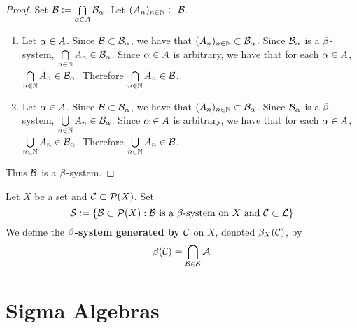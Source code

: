 \documentclass{book}
\begin{document}
	\begin{proof}Set $\mathcal{B} \vcentcolon= \bigcap\limits_{\alpha \in A} \mathcal{B}_{\alpha}$. Let $(A_n)_{n \in \mathbb{N}} \subset \mathcal{B}$.
		\begin{enumerate}
			\item Let $\alpha \in A$. Since $\mathcal{B} \subset \mathcal{B}_{\alpha}$, we have that $(A_n)_{n \in \mathbb{N}} \subset \mathcal{B}_{\alpha}$. Since $\mathcal{B}_{\alpha}$ is a $\beta$-system, $\bigcap\limits_{n \in \mathbb{N}} A_n \in \mathcal{B}_{\alpha}$. Since $\alpha \in A$ is arbitrary, we have that for each $\alpha \in A$, $\bigcap\limits_{n \in \mathbb{N}} A_n \in \mathcal{B}_{\alpha}$. Therefore $\bigcap\limits_{n \in \mathbb{N}} A_n \in \mathcal{B}$.   
			\item Let $\alpha \in A$. Since $\mathcal{B} \subset \mathcal{B}_{\alpha}$, we have that $(A_n)_{n \in \mathbb{N}} \subset \mathcal{B}_{\alpha}$. Since $\mathcal{B}_{\alpha}$ is a $\beta$-system, $\bigcup\limits_{n \in \mathbb{N}} A_n \in \mathcal{B}_{\alpha}$. Since $\alpha \in A$ is arbitrary, we have that for each $\alpha \in A$, $\bigcup\limits_{n \in \mathbb{N}} A_n \in \mathcal{B}_{\alpha}$. Therefore $\bigcup\limits_{n \in \mathbb{N}} A_n \in \mathcal{B}$.   
		\end{enumerate}
		Thus $\mathcal{B}$ is a $\beta$-system.
	\end{proof}
	
	\begin{defn}  
		Let $X$ be a set and $\mathcal{C} \subset \mathcal{P}(X)$. Set 
		$$\mathcal{S} \vcentcolon= \{\mathcal{B} \subset \mathcal{P}(X): \mathcal{B} \text{ is a $\beta$-system on $X$ and $\mathcal{C} \subset \mathcal{L}$} \}$$ 
		We define the \textbf{$\beta$-system generated by $\mathcal{C}$} on $X$, denoted $\beta_X(\mathcal{C})$, by $$\beta(\mathcal{C}) = \bigcap_{\mathcal{B} \in \mathcal{S}} \mathcal{A} $$
	\end{defn}

	









































	\newpage
	\section{Sigma Algebras}
		
\end{document}
